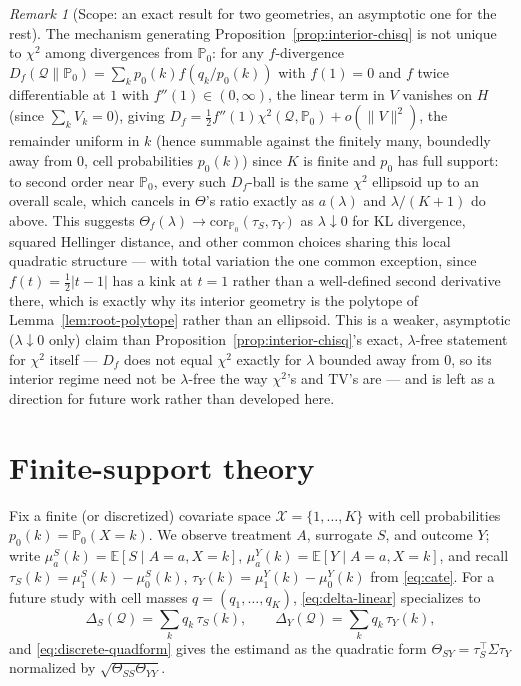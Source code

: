 \documentclass[11pt]{article}
\theoremstyle{plain}
\theoremstyle{definition}
\theoremstyle{remark}
\newtheorem{remark}[theorem]{Remark}
\newcommand{\E}{\mathbb{E}}
\newcommand{\PP}{\mathbb{P}}
\newcommand{\cX}{\mathcal{X}}
\newcommand{\Q}{\mathcal{Q}}
\newcommand{\Corr}{\mathrm{cor}}
\begin{document}
\begin{remark}[Scope: an exact result for two geometries, an asymptotic one for the
rest]\label{rem:chisq-general}
The mechanism generating Proposition~\ref{prop:interior-chisq} is not unique to
$\chi^2$ among divergences from $\PP_0$: for any $f$-divergence
$D_f(\Q\|\PP_0)=\sum_kp_0(k)f(q_k/p_0(k))$ with $f(1)=0$ and $f$ twice
differentiable at $1$ with $f''(1)\in(0,\infty)$, the linear term in $V$ vanishes on
$H$ (since $\sum_kV_k=0$), giving $D_f=\tfrac12f''(1)\chi^2(\Q,\PP_0)+o(\|V\|^2)$,
the remainder uniform in $k$ (hence summable against the finitely many, boundedly
away from $0$, cell probabilities $p_0(k)$) since $K$ is finite and $p_0$ has full
support: to second order near $\PP_0$, every such $D_f$-ball is the same $\chi^2$
ellipsoid up to an overall scale, which cancels in $\Theta$'s ratio exactly as
$a(\lambda)$ and $\lambda/(K+1)$ do above. This suggests
$\Theta_f(\lambda)\to\Corr_{\PP_0}(\tau_S,\tau_Y)$
as $\lambda\downarrow0$ for KL divergence, squared Hellinger distance, and other
common choices sharing this local quadratic structure --- with total variation the
one common exception, since $f(t)=\tfrac12|t-1|$ has a kink at $t=1$ rather than a
well-defined second derivative there, which is exactly why its interior geometry is
the polytope of Lemma~\ref{lem:root-polytope} rather than an ellipsoid. This is a
weaker, asymptotic ($\lambda\downarrow0$ only) claim than
Proposition~\ref{prop:interior-chisq}'s exact, $\lambda$-free statement for
$\chi^2$ itself --- $D_f$ does not equal $\chi^2$ exactly for $\lambda$ bounded away
from $0$, so its interior regime need not be $\lambda$-free the way $\chi^2$'s and
TV's are --- and is left as a direction for future work rather than developed here.
\end{remark}


\section{Finite-support theory}\label{sec:layer1}

Fix a finite (or discretized) covariate space $\cX=\{1,\dots,K\}$ with cell
probabilities $p_0(k)=\PP_0(X=k)$. We observe treatment $A$, surrogate $S$, and
outcome $Y$; write $\mu_a^S(k)=\E[S\mid A=a,X=k]$, $\mu_a^Y(k)=\E[Y\mid A=a,X=k]$, and
recall $\tau_S(k)=\mu_1^S(k)-\mu_0^S(k)$, $\tau_Y(k)=\mu_1^Y(k)-\mu_0^Y(k)$ from
\eqref{eq:cate}. For a future study with cell masses $q=(q_1,\dots,q_K)$,
\eqref{eq:delta-linear} specializes to
\begin{equation}\label{eq:delta-discrete}
    \Delta_S(\Q) = \sum_k q_k\,\tau_S(k), \qquad \Delta_Y(\Q) = \sum_k q_k\,\tau_Y(k),
\end{equation}
and \eqref{eq:discrete-quadform} gives the estimand as the quadratic form
$\Theta_{SY}=\tau_S^\top\Sigma\tau_Y$ normalized by $\sqrt{\Theta_{SS}\Theta_{YY}}$.
\end{document}

